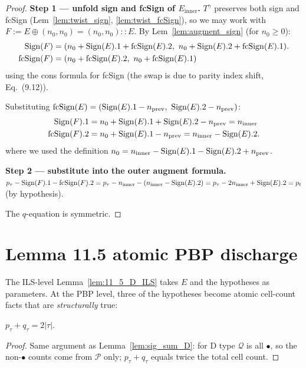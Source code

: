 \begin{proof}
  \leanok
  \textbf{Step 1 — unfold sign and fcSign of $E_{\mathrm{inner}}$.}
  $T^\gamma$ preserves both sign and fcSign (Lem~\ref{lem:twist_sign}, \ref{lem:twist_fcSign}), so we may work with $F := E \oplus (n_0, n_0) = (n_0, n_0) :: E$.
  By Lem~\ref{lem:augment_sign} (for $n_0 \geq 0$):
  \begin{align*}
    \mathrm{Sign}(F) &= (n_0 + \mathrm{Sign}(E).1 + \mathrm{fcSign}(E).2,\ n_0 + \mathrm{Sign}(E).2 + \mathrm{fcSign}(E).1). \\
    \mathrm{fcSign}(F) &= (n_0 + \mathrm{fcSign}(E).2,\ n_0 + \mathrm{fcSign}(E).1)
  \end{align*}
  using the cons formula for fcSign (the swap is due to parity index shift, Eq.~(9.12)).

  Substituting $\mathrm{fcSign}(E) = (\mathrm{Sign}(E).1 - n_{\mathrm{prev}},\ \mathrm{Sign}(E).2 - n_{\mathrm{prev}})$:
  \begin{align*}
    \mathrm{Sign}(F).1 &= n_0 + \mathrm{Sign}(E).1 + \mathrm{Sign}(E).2 - n_{\mathrm{prev}} = n_{\mathrm{inner}} \\
    \mathrm{fcSign}(F).2 &= n_0 + \mathrm{Sign}(E).1 - n_{\mathrm{prev}} = n_{\mathrm{inner}} - \mathrm{Sign}(E).2.
  \end{align*}
  where we used the definition $n_0 = n_{\mathrm{inner}} - \mathrm{Sign}(E).1 - \mathrm{Sign}(E).2 + n_{\mathrm{prev}}$.

  \textbf{Step 2 — substitute into the outer augment formula.}
  $p_\tau - \mathrm{Sign}(F).1 - \mathrm{fcSign}(F).2 = p_\tau - n_{\mathrm{inner}} - (n_{\mathrm{inner}} - \mathrm{Sign}(E).2) = p_\tau - 2 n_{\mathrm{inner}} + \mathrm{Sign}(E).2 = p_t$ (by hypothesis).

  The $q$-equation is symmetric.
\end{proof}

\section{Lemma 11.5 atomic PBP discharge}

The ILS-level Lemma~\ref{lem:11_5_D_ILS} takes $E$ and the hypotheses as parameters.
At the PBP level, three of the hypotheses become atomic cell-count facts that
are \emph{structurally} true:

\begin{lemma}
  \label{lem:fact1_sig_sum}
  \leanok
  $p_\tau + q_\tau = 2|\tau|$.
\end{lemma}
\begin{proof}
  \leanok
  Same argument as Lemma~\ref{lem:sig_sum_D}: for D type $\mathcal{Q}$ is all $\bullet$, so the non-$\bullet$ counts come from $\mathcal{P}$ only; $p_\tau + q_\tau$ equals twice the total cell count.
\end{proof}


